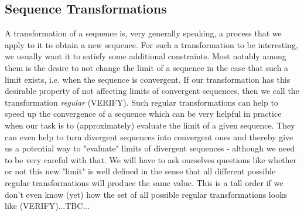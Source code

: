


\subsection{Sequence Transformations}
A transformation of a sequence is, very generally speaking, a process that we apply to it to obtain a new sequence. For such a transformation to be interesting, we usually want it to satisfy some additional constraints. Most notably among them is the desire to not change the limit of a sequence in the case that such a limit exists, i.e. when the sequence is convergent. If our transformation has this desirable property of not affecting limits of convergent sequences, then we call the transformation \emph{regular} (VERIFY). Such regular transformations can help to speed up the convergence of a sequence which can be very helpful in practice when our task is to (approximately) evaluate the limit of a given sequence. They can even help to turn divergent sequences into convergent ones and thereby give us a potential way to "evaluate" limits of divergent sequences - although we need to be very careful with that. We will have to ask ourselves questions like whether or not this new "limit" is well defined in the sense that all different possible regular transformations will produce the same value. This is a tall order if we don't even know (yet) how the set of all possible regular transformations looks like (VERIFY)...TBC...






